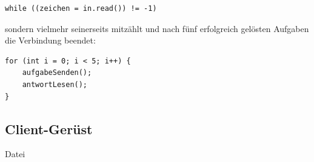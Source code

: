 \begin{lstlisting}
while ((zeichen = in.read()) != -1)
\end{lstlisting}
   
sondern vielmehr seinerseits mitzählt und nach fünf erfolgreich gelösten
Aufgaben die Verbindung beendet:

\begin{lstlisting}
for (int i = 0; i < 5; i++) {
    aufgabeSenden();
    antwortLesen();
}
\end{lstlisting}


\subsection{Client-Gerüst}

Datei 

